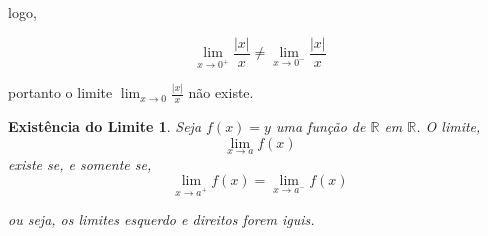 		logo,
		
			$$\lim_{x \to 0^{+}} \frac{|x|}{x} \neq \lim_{x \to 0^{-}} \frac{|x|}{x}$$
			
		portanto o limite $\lim_{x \to 0} \frac{|x|}{x}$ não existe.
		
		\newtheorem*{mydeftheorem}{Existência do Limite}
		\begin{mydeftheorem}
			Seja $f(x) = y$ uma função de $\mathbb{R}$ em $\mathbb{R}$. O limite,
				$$\lim_{x \to a} f(x) $$
			existe se, e somente se,
				$$\lim_{x \to a^{+}} f(x)= \lim_{x \to a^{-}} f(x)$$
				
			ou seja, os limites esquerdo e direitos forem iguis.
		\end{mydeftheorem}
		
			